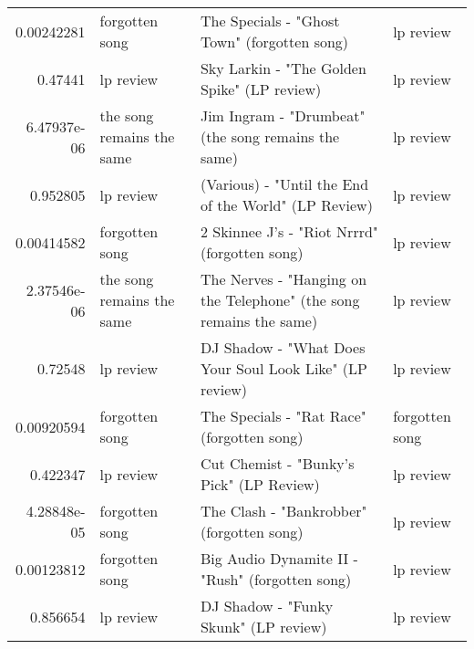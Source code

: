 \documentclass[letterpaper,10pt]{article}
\begin{document}
\begin{table}[H]
\begin{adjustbox}{max width=\linewidth}
\begin{tabular}{rlll}
  0.00242281  & forgotten song            & The Specials - "Ghost Town" (forgotten song)                                                                 & lp review                 \\
  0.47441     & lp review                 & Sky Larkin - "The Golden Spike" (LP review)                                                                  & lp review                 \\
  6.47937e-06 & the song remains the same & Jim Ingram - "Drumbeat" (the song remains the same)                                                          & lp review                 \\
  0.952805    & lp review                 & (Various) - "Until the End of the World" (LP Review)                                                         & lp review                 \\
  0.00414582  & forgotten song            & 2 Skinnee J's - "Riot Nrrrd" (forgotten song)                                                                & lp review                 \\
  2.37546e-06 & the song remains the same & The Nerves - "Hanging on the Telephone" (the song remains the same)                                          & lp review                 \\
  0.72548     & lp review                 & DJ Shadow - "What Does Your Soul Look Like" (LP review)                                                      & lp review                 \\
  0.00920594  & forgotten song            & The Specials - "Rat Race" (forgotten song)                                                                   & forgotten song            \\
  0.422347    & lp review                 & Cut Chemist - "Bunky's Pick" (LP Review)                                                                     & lp review                 \\
  4.28848e-05 & forgotten song            & The Clash - "Bankrobber" (forgotten song)                                                                    & lp review                 \\
  0.00123812  & forgotten song            & Big Audio Dynamite II - "Rush" (forgotten song)                                                              & lp review                 \\
  0.856654    & lp review                 & DJ Shadow - "Funky Skunk" (LP review)                                                                        & lp review                 \\

\end{tabular}
\end{adjustbox}
\end{table}
\end{document}
